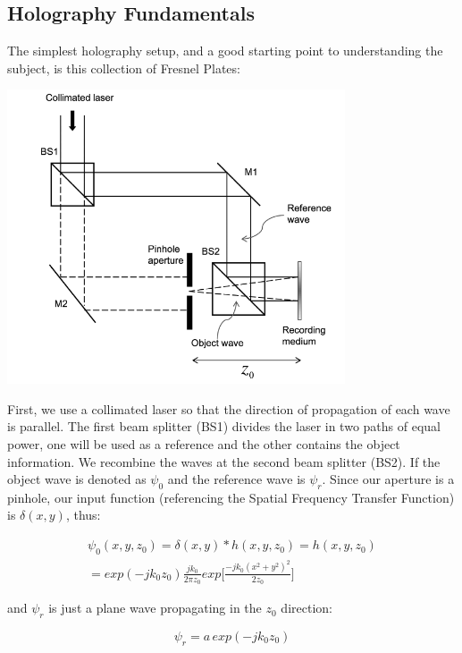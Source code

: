 \documentclass[12pt]{article}
\begin{document}
\subsection{Holography Fundamentals}

The simplest holography setup, and a good starting point to understanding the subject, is this collection of Fresnel Plates:

\begin{center}
	\includegraphics[width=100mm]{tupac7.png}	
\end{center}

First, we use a collimated laser so that the direction of propagation of each wave is parallel.
The first beam splitter (BS1) divides the laser in two paths of equal power, one will be used as a reference and the other contains the object information.
We recombine the waves at the second beam splitter (BS2). If the object wave is denoted as \(\psi_{0}\) and the reference wave is \(\psi_{r}\).
Since our aperture is a pinhole, our input function (referencing the Spatial Frequency Transfer Function) is \(\delta(x,y)\), thus:

\begin{equation}
	\begin{multlined}
		\psi_{0}(x,y,z_{0}) = \delta(x,y) * h(x,y,z_{0}) = h(x,y,z_{0}) 
		\\= exp(-jk_{0}z_{0})\frac{jk_{0}}{2\pi z_{0}}exp\bigg[\frac{-jk_{0}(x^2 + y^2)^2}{2z_{0}}\bigg]
	\end{multlined}
\end{equation}

and \(\psi_{r}\) is just a plane wave propagating in the \(z_{0}\) direction:

\begin{equation}
	\psi_{r} = a\,exp(-jk_{0}z_{0})
\end{equation}
\end{document}
